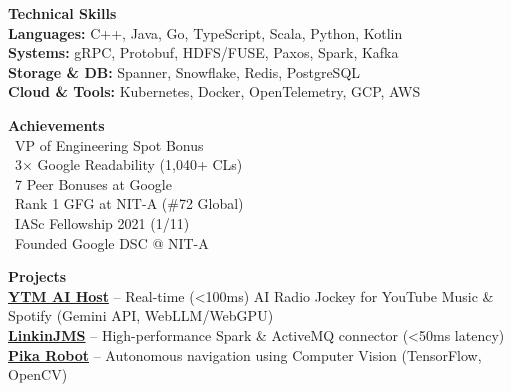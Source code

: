 \documentclass[letterpaper,10pt]{article}
\begin{document}
\begin{minipage}[t]{0.39\textwidth}
{\begin{minipage}[t]{0.90\linewidth}
\vspace{4pt}{\color{GoogleLightGray}\rule{\linewidth}{0.3pt}}\vspace{4pt}

{\selectfont\small\bfseries\color{TextBlack}Technical Skills}\\[2pt]
{\selectfont\footnotesize\color{TextBlack}%
\textbf{Languages:} C++, Java, Go, TypeScript, Scala, Python, Kotlin\\[1pt]
\textbf{Systems:} gRPC, Protobuf, HDFS/FUSE, Paxos, Spark, Kafka\\[1pt]
\textbf{Storage \& DB:} Spanner, Snowflake, Redis, PostgreSQL\\[1pt]
\textbf{Cloud \& Tools:} Kubernetes, Docker, OpenTelemetry, GCP, AWS%
}

\vspace{4pt}{\color{GoogleLightGray}\rule{\linewidth}{0.3pt}}\vspace{4pt}

{\selectfont\small\bfseries\color{TextBlack}Achievements}\\[2pt]
{\selectfont\footnotesize\color{TextBlack}%
{\color{GoogleBlue}\faTrophy}~VP of Engineering Spot Bonus\\[1pt]
{\color{GoogleBlue}\faTrophy}~3$\times$ Google Readability (1,040+ CLs)\\[1pt]
{\color{GoogleBlue}\faTrophy}~7 Peer Bonuses at Google\\[1pt]
{\color{GoogleGreen}\faMedal}~Rank 1 GFG at NIT-A (\#72 Global)\\[1pt]
{\color{GoogleBlue}\faAward}~IASc Fellowship 2021 (1/11)\\[1pt]
{\color{GoogleGreen}\faUsers}~Founded Google DSC @ NIT-A%
}

\vspace{4pt}{\color{GoogleLightGray}\rule{\linewidth}{0.3pt}}\vspace{4pt}

{\selectfont\small\bfseries\color{TextBlack}Projects}\\[2pt]
{\selectfont\footnotesize\color{TextBlack}%
{\color{LinkBlue}\href{https://github.com/iu-sh/ytm_ai_host}{\textbf{YTM AI Host}}} -- Real-time (<100ms) AI Radio Jockey for YouTube Music \& Spotify (Gemini API, WebLLM/WebGPU)\\[1pt]
{\color{LinkBlue}\href{https://github.com/iu-sh/linkinJMS}{\textbf{LinkinJMS}}} -- High-performance Spark \& ActiveMQ connector (<50ms latency)\\[1pt]
{\color{LinkBlue}\href{https://youtu.be/0Fff2ncdbPo}{\textbf{Pika Robot}}} -- Autonomous navigation using Computer Vision (TensorFlow, OpenCV)%
}


\end{minipage}}
\end{minipage}
\end{document}
